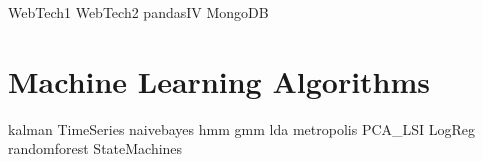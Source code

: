 \documentclass[nociteref]{SIAM-GH-book}
\begin{document}
{WebTech1}
{WebTech2}
{pandasIV}
{MongoDB}

\part{Machine Learning Algorithms}
{kalman}
{TimeSeries}
{naivebayes}
{hmm}
{gmm}
{lda}
{metropolis}
{PCA_LSI}
{LogReg}
{randomforest}
{StateMachines}
\end{document}
